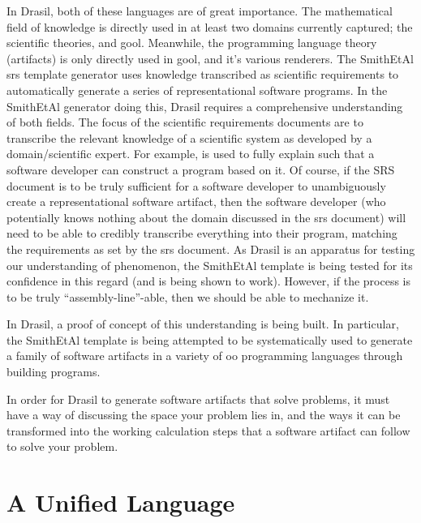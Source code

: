 In Drasil, both of these languages are of great importance. The mathematical
field of knowledge is directly used in at least two domains currently captured;
the scientific theories, and \acs{gool}\cite{Carette2019}. Meanwhile, the
programming language theory (artifacts) is only directly used in \acs{gool}, and
it's various renderers. The SmithEtAl \acs{srs} \cite{SmithAndLai2005} template
generator uses knowledge transcribed as scientific requirements to automatically
generate a series of representational software programs. In the SmithEtAl
generator doing this, Drasil requires a comprehensive understanding of both
fields. The focus of the scientific requirements documents are to transcribe the
relevant knowledge of a scientific system as developed by a domain/scientific
expert. For example,  is used to fully explain
 such that a software developer can construct a program based on
it. Of course, if the SRS document is to be truly sufficient for a software
developer to unambiguously create a representational software artifact, then the
software developer (who potentially knows nothing about the domain discussed in
the \acs{srs} document) will need to be able to credibly transcribe everything
into their program, matching the requirements as set by the \acs{srs} document.
As Drasil is an apparatus for testing our understanding of phenomenon, the
SmithEtAl template is being tested for its confidence in this regard (and is
being shown to work). However, if the process is to be truly
``assembly-line''-able, then we should be able to mechanize it.

In Drasil, a proof of concept of this understanding is being built. In
particular, the SmithEtAl template is being attempted to be systematically used
to generate a family of software artifacts in a variety of \acl{oo} programming
languages through building  programs.

In order for Drasil to generate software artifacts that solve problems, it must
have a way of discussing the space your problem lies in, and the ways it can be
transformed into the working calculation steps that a software artifact can
follow to solve your problem.

\section{A Unified Language}
\label{sec:modelkinds:language}

\originalExprHaskell


